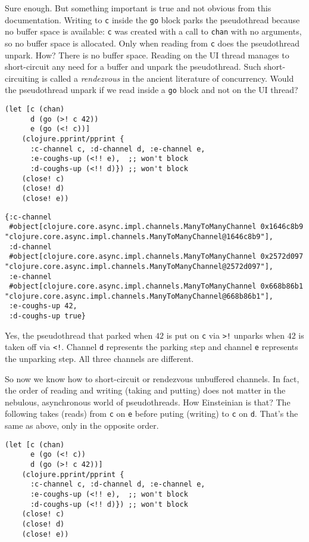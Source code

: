 \documentclass[10pt,oneside,x11names]{article}
\begin{document}
Sure enough. But something important is true and not obvious from this
documentation. Writing to \texttt{c} inside the \texttt{go} block parks the
pseudothread because no buffer space is available: \texttt{c} was created with
a call to \texttt{chan} with no arguments, so no buffer space is allocated.
Only when reading from \texttt{c} does the pseudothread unpark. How? There is
no buffer space. Reading on the UI thread manages to short-circuit any
need for a buffer and unpark the pseudothread. Such short-circuiting is
called a \emph{rendezvous} in the ancient literature of concurrency. Would
the pseudothread unpark if we read inside a \texttt{go} block and not on the UI
thread?

\begin{verbatim}
(let [c (chan)
      d (go (>! c 42))
      e (go (<! c))]
    (clojure.pprint/pprint {
      :c-channel c, :d-channel d, :e-channel e,
      :e-coughs-up (<!! e),  ;; won't block
      :d-coughs-up (<!! d)}) ;; won't block
    (close! c)
    (close! d)
    (close! e))
\end{verbatim}

\begin{verbatim}
{:c-channel
 #object[clojure.core.async.impl.channels.ManyToManyChannel 0x1646c8b9 "clojure.core.async.impl.channels.ManyToManyChannel@1646c8b9"],
 :d-channel
 #object[clojure.core.async.impl.channels.ManyToManyChannel 0x2572d097 "clojure.core.async.impl.channels.ManyToManyChannel@2572d097"],
 :e-channel
 #object[clojure.core.async.impl.channels.ManyToManyChannel 0x668b86b1 "clojure.core.async.impl.channels.ManyToManyChannel@668b86b1"],
 :e-coughs-up 42,
 :d-coughs-up true}
\end{verbatim}


Yes, the pseudothread that parked when \(42\) is put on \texttt{c} via \texttt{>!}
unparks when \(42\) is taken off via \texttt{<!}. Channel \texttt{d} represents the
parking step and channel \texttt{e} represents the unparking step. All three
channels are different.

So now we know how to short-circuit or rendezvous unbuffered channels.
In fact, the order of reading and writing (taking and putting) does not
matter in the nebulous, asynchronous world of pseudothreads. How
Einsteinian is that? The following takes (reads) from \texttt{c} on \texttt{e} before
puting (writing) to \texttt{c} on \texttt{d}. That's the same as above, only in the
opposite order.

\begin{verbatim}
(let [c (chan)
      e (go (<! c))
      d (go (>! c 42))]
    (clojure.pprint/pprint {
      :c-channel c, :d-channel d, :e-channel e,
      :e-coughs-up (<!! e),  ;; won't block
      :d-coughs-up (<!! d)}) ;; won't block
    (close! c)
    (close! d)
    (close! e))
\end{verbatim}
\end{document}
